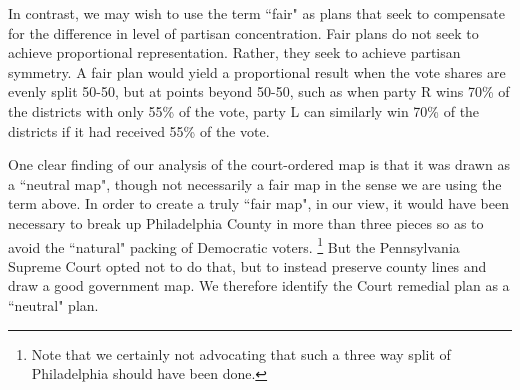 \par
    In contrast, we may wish to use the term ``fair" as plans that seek to compensate for the difference in level of partisan concentration. Fair plans do not seek to achieve proportional representation. Rather, they seek to achieve partisan symmetry. A fair plan would yield a proportional result when the vote shares are evenly split 50-50, but at points beyond 50-50, such as when party R wins 70\% of the districts with only 55\% of the vote, party L can similarly win 70\% of the districts if it had received 55\% of the vote.
\par
    One clear finding of our analysis of the court-ordered map is that it was drawn as a ``neutral map", though not necessarily a fair map in the sense we are using the term above. In order to create a truly ``fair map", in our view, it would have been necessary to break up Philadelphia County in more than three pieces so as to avoid the ``natural" packing of Democratic voters.
        \footnote{Note that we certainly not advocating that such a three way split of Philadelphia should have been done.}
    But the Pennsylvania Supreme Court opted not to do that, but to instead preserve county lines and draw a good government map. We therefore identify the Court remedial plan as a ``neutral" plan.
\par
%
